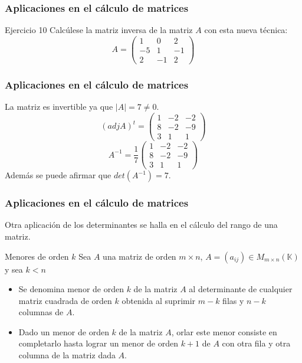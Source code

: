 \documentclass[12pt]{article}
\begin{document}
  \begin{frame}
  \frametitle{Aplicaciones en el c\'alculo de matrices}
     \begin{block}{Ejercicio 10}
Calc\'ulese la matriz inversa de la matriz $A$ con esta nueva t\'ecnica:
\[A=\left(\begin{array}{ccc}1 & 0 & 2 \\-5 & 1 & -1 \\2 & -1 & 2\end{array}\right)\]
\end{block}
\end{frame}   
  
  
  
    \begin{frame}
  \frametitle{Aplicaciones en el c\'alculo de matrices}
    La matriz es invertible ya que $|A| = 7\neq 0$. 
\[(adjA)^t=\left(\begin{array}{ccc}1 & -2 & -2 \\8 & -2 & -9 \\3 & 1 & 1\end{array}\right)\]
\[A^{-1}=\frac{1}{7}\left(\begin{array}{ccc}1 & -2 & -2 \\8 & -2 & -9 \\3 & 1 & 1\end{array}\right)\]
Adem\'as se puede afirmar que $det(A^{-1}) = 7$.
\end{frame}   
  
    \begin{frame}
  \frametitle{Aplicaciones en el c\'alculo de matrices}
  Otra aplicaci\'on de los determinantes se halla en el c\'alculo del rango de una matriz.
     \begin{block}{Menores de orden $k$}
Sea $A$ una matriz de orden $m\times n$, $A=(a_{ij})\in M_{m\times n}(\mathbb{K})$ y sea $k<n$
\begin{itemize}
\item Se denomina menor de orden $k$ de la matriz $A$ al determinante de cualquier matriz cuadrada de orden $k$ obtenida al suprimir $m-k$ filas y $n-k$ columnas de $A$. 
\item Dado un menor de orden $k$ de la matriz $A$, orlar este menor consiste en completarlo hasta lograr un menor de orden $k+1$ de $A$ con otra fila y otra columna de la matriz dada $A$.
\end{itemize}
\end{block}
\end{frame}   
  
\end{document}
